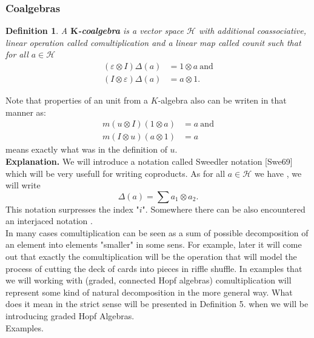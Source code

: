 \documentclass[a4paper]{article}
\newtheorem{definition}{Definition}
\begin{document}
\subsubsection{Coalgebras}
\begin{definition}
A \textbf{$\textbf{K}$-coalgebra} is a vector space $\mathcal{H}$
with additional coassociative, linear operation
 called comultiplication and
a linear map  called counit such that for all
$a \in \mathcal{H}$
\begin{align*}
(\varepsilon \otimes I)\Delta(a) &= 1 \otimes a \mathrm{\ and} \\
(I \otimes \varepsilon)\Delta(a) &= a \otimes 1.
\end{align*}
\end{definition}
Note that properties of an unit from a $K$-algebra also can be writen in that manner as:
\begin{align*}
m(u \otimes I)(1 \otimes a) &= a \mathrm{\ and}\\
m(I \otimes u)(a \otimes 1) &= a
\end{align*}
means exactly what was in the definition of $u$. \\[8pt]
\textbf{Explanation.} We will introduce a notation called Sweedler notation [Swe69] which will be
very usefull
for writing coproducts. As for all $a \in \mathcal{H}$ we have
, we will write
\begin{equation*}
\Delta(a) = \displaystyle\sum a_1 \otimes a_2.
\end{equation*}
This notation surpresses the index "$i$". Somewhere there can be also encountered an interjaced
notation . \\
In many cases comultiplication can be seen as a sum of possible decomposition of an element into
elements "smaller" in some sens.
For example, later it will come out that exactly the comultiplication will be the operation that will
model the process of cutting the deck of cards into pieces in riffle shuffle. In examples that we will working
with (graded, connected Hopf algebras) comultiplication will represent some kind of natural decomposition
in the more general way. What does it mean in the strict sense will be presented in Definition 5. when we
will be introducing graded Hopf Algebras. \\
Examples. \\[8pt]
\end{document}
